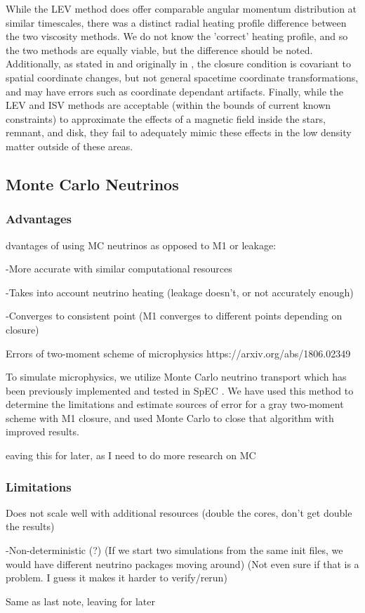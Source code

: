 \documentclass[%
twocolumn,
superscriptaddress,
nofootinbib,
 amsmath,amssymb,
 aps, prd
]{revtex4-2}
\newcommand{\alex}[1]{\color{red}{#1}}
\begin{document}
       While the LEV method does offer comparable angular momentum distribution at similar timescales, there was a distinct radial heating profile difference between the two viscosity methods.
       We do not know the 'correct' heating profile, and so the two methods are equally viable, but the difference should be noted.
       Additionally, as stated in \cite{Duez_2020} and originally in \cite{Radice_2017}, the closure condition is covariant to spatial coordinate changes, but not general spacetime coordinate transformations, and may have errors such as coordinate dependant artifacts.
       Finally, while the LEV and ISV methods are acceptable (within the bounds of current known constraints) to approximate the effects of a magnetic field inside the stars, remnant, and disk, they fail to adequately mimic these effects in the low density matter outside of these areas.

  \subsection{Monte Carlo Neutrinos}
      \subsubsection{Advantages}
      {\alex

        Advantages of using MC neutrinos as opposed to M1 or leakage:

          -More accurate with similar computational resources

          -Takes into account neutrino heating (leakage doesn't, or not accurately enough)

          -Converges to consistent point (M1 converges to different points depending on closure)

          Errors of two-moment scheme of microphysics https://arxiv.org/abs/1806.02349
          }

          To simulate microphysics, we utilize Monte Carlo neutrino transport which has been previously implemented and tested in SpEC \cite{Foucart_2020, Foucart_2021}.
          We have used this method to determine the limitations and estimate sources of error for a gray two-moment scheme with M1 closure, and used Monte Carlo to close that algorithm with improved results.

          {\alex Leaving this for later, as I need to do more research on MC}

          


      \subsubsection{Limitations}
      {\alex

        -Does not scale well with additional resources (double the cores, don't get double the results)

        -Non-deterministic (?) (If we start two simulations from the same init files, we would have different neutrino packages moving around) (Not even sure if that is a problem. I guess it makes it harder to verify/rerun)

        Same as last note, leaving for later}
\end{document}
